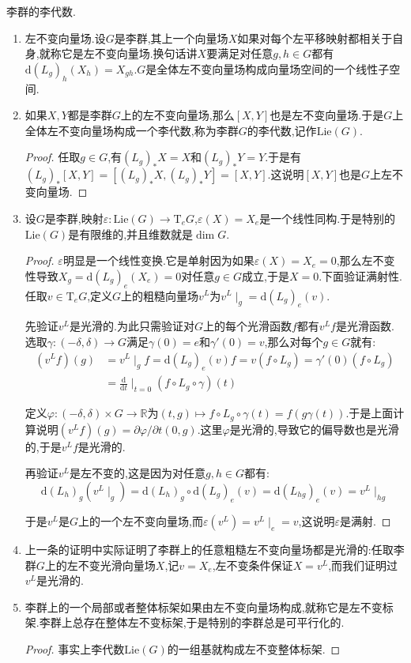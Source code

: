 李群的李代数.
\begin{enumerate}
	\item 左不变向量场.设$G$是李群,其上一个向量场$X$如果对每个左平移映射都相关于自身,就称它是左不变向量场.换句话讲$X$要满足对任意$g,h\in G$都有$\mathrm{d}(L_g)_h(X_h)=X_{gh}$.$G$是全体左不变向量场构成向量场空间的一个线性子空间.
	\item 如果$X,Y$都是李群$G$上的左不变向量场,那么$[X,Y]$也是左不变向量场.于是$G$上全体左不变向量场构成一个李代数,称为李群$G$的李代数,记作$\mathrm{Lie}(G)$.
	\begin{proof}
		
		任取$g\in G$,有$(L_g)_*X=X$和$(L_g)_*Y=Y$.于是有$(L_g)_*[X,Y]=[(L_g)_*X,(L_g)_*Y]=[X,Y]$.这说明$[X,Y]$也是$G$上左不变向量场.
	\end{proof}
    \item 设$G$是李群,映射$\varepsilon:\mathrm{Lie}(G)\to\mathrm{T}_eG$,$\varepsilon(X)=X_e$是一个线性同构.于是特别的$\mathrm{Lie}(G)$是有限维的,并且维数就是$\dim G$.
    \begin{proof}
    	
    	$\varepsilon$明显是一个线性变换.它是单射因为如果$\varepsilon(X)=X_e=0$,那么左不变性导致$X_g=\mathrm{d}(L_g)_e(X_e)=0$对任意$g\in G$成立,于是$X=0$.下面验证满射性.任取$v\in\mathrm{T}_eG$,定义$G$上的粗糙向量场$v^L$为$v^L\mid_g=\mathrm{d}(L_g)_e(v)$.
    	
    	先验证$v^L$是光滑的.为此只需验证对$G$上的每个光滑函数$f$都有$v^Lf$是光滑函数.选取$\gamma:(-\delta,\delta)\to G$满足$\gamma(0)=e$和$\gamma'(0)=v$,那么对每个$g\in G$就有:
    	\begin{align*}
    	(v^Lf)(g)&=v^L\mid_gf=\mathrm{d}(L_g)_e(v)f=v(f\circ L_g)=\gamma'(0)(f\circ L_g)\\&=\frac{\mathrm{d}}{\mathrm{d}t}\mid_{t=0}(f\circ L_g\circ\gamma)(t)
    	\end{align*}
    	
    	定义$\varphi:(-\delta,\delta)\times G\to\mathbb{R}$为$(t,g)\mapsto f\circ L_g\circ\gamma(t)=f(g\gamma(t))$.于是上面计算说明$(v^Lf)(g)=\partial\varphi/\partial t(0,g)$.这里$\varphi$是光滑的,导致它的偏导数也是光滑的,于是$v^Lf$是光滑的.
    	
    	再验证$v^L$是左不变的,这是因为对任意$g,h\in G$都有:
    	$$\mathrm{d}(L_h)_g(v^L\mid_g)=\mathrm{d}(L_h)_g\circ\mathrm{d}(L_g)_e(v)=\mathrm{d}(L_{hg})_e(v)=v^L\mid_{hg}$$
    	
    	于是$v^L$是$G$上的一个左不变向量场,而$\varepsilon(v^L)=v^L\mid_e=v$,这说明$\varepsilon$是满射.
    \end{proof}
    \item 上一条的证明中实际证明了李群上的任意粗糙左不变向量场都是光滑的:任取李群$G$上的左不变光滑向量场$X$,记$v=X_e$,左不变条件保证$X=v^L$,而我们证明过$v^L$是光滑的.
    \item 李群上的一个局部或者整体标架如果由左不变向量场构成,就称它是左不变标架.李群上总存在整体左不变标架,于是特别的李群总是可平行化的.
    \begin{proof}
    	
    	事实上李代数$\mathrm{Lie}(G)$的一组基就构成左不变整体标架.
    \end{proof}
\end{enumerate}

